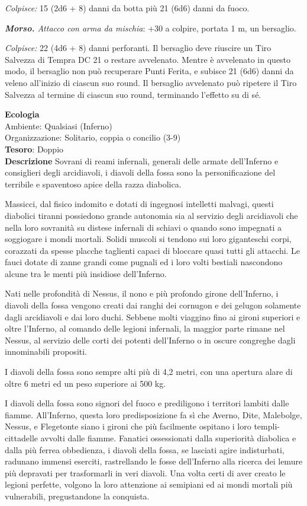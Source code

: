 \begin{multicols}{2}
	\textit{Colpisce:} 15 (2d6 + 8) danni da botta più 21 (6d6) danni da fuoco.

	\textit{\textbf{Morso.} Attacco con arma da mischia}: +30 a colpire, portata 1 m, un bersaglio.

	\textit{Colpisce:} 22 (4d6 + 8) danni perforanti. Il bersaglio deve riuscire un Tiro Salvezza di Tempra DC 21 o restare avvelenato. Mentre è avvelenato in questo modo, il bersaglio non può recuperare Punti Ferita, e subisce 21 (6d6) danni da veleno all'inizio di ciascun suo round. Il bersaglio avvelenato può ripetere il Tiro Salvezza al termine di ciascun suo round, terminando l'effetto su di sé.

	\textbf{Ecologia}\\
	Ambiente: Qualsiasi (Inferno)\\
	Organizzazione: Solitario, coppia o concilio (3-9)\\
	\textbf{Tesoro}: Doppio\\
	\textbf{Descrizione}
	Sovrani di reami infernali, generali delle armate dell'Inferno e consiglieri degli arcidiavoli, i diavoli della fossa sono la personificazione del terribile e spaventoso apice della razza diabolica.

	Massicci, dal fisico indomito e dotati di ingegnosi intelletti malvagi, questi diabolici tiranni possiedono grande autonomia sia al servizio degli arcidiavoli che nella loro sovranità su distese infernali di schiavi o quando sono impegnati a soggiogare i mondi mortali. Solidi muscoli si tendono sui loro giganteschi corpi, corazzati da spesse placche taglienti capaci di bloccare quasi tutti gli attacchi. Le fauci dotate di zanne grandi come pugnali ed i loro volti bestiali nascondono alcune tra le menti più insidiose dell'Inferno.

	Nati nelle profondità di Nessus, il nono e più profondo girone dell'Inferno, i diavoli della fossa vengono creati dai ranghi dei cornugon e dei gelugon solamente dagli arcidiavoli e dai loro duchi. Sebbene molti viaggino fino ai gironi superiori e oltre l'Inferno, al comando delle legioni infernali, la maggior parte rimane nel Nessus, al servizio delle corti dei potenti dell'Inferno o in oscure congreghe dagli innominabili propositi.

	I diavoli della fossa sono sempre alti più di 4,2 metri, con una apertura alare di oltre 6 metri ed un peso superiore ai 500 kg.

	I diavoli della fossa sono signori del fuoco e prediligono i territori lambiti dalle fiamme. All'Inferno, questa loro predisposizione fa sì che Averno, Dite, Malebolge, Nessus, e Flegetonte siano i gironi che più facilmente ospitano i loro templi-cittadelle avvolti dalle fiamme. Fanatici ossessionati dalla superiorità diabolica e dalla più ferrea obbedienza, i diavoli della fossa, se lasciati agire indisturbati, radunano immensi eserciti, rastrellando le fosse dell'Inferno alla ricerca dei lemure più depravati per trasformarli in veri diavoli. Una volta certi di aver creato le legioni perfette, volgono la loro attenzione ai semipiani ed ai mondi mortali più vulnerabili, pregustandone la conquista.


\end{multicols}
